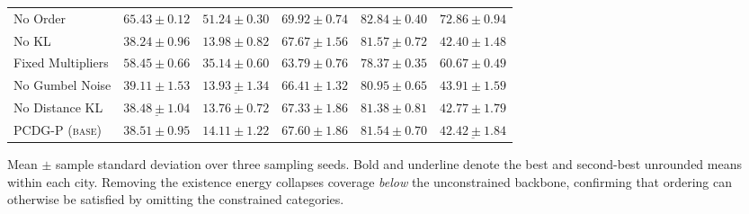 \begin{table}[t]
\begin{tabular}{lrrrrr}
No Order & $65.43\pm 0.12$ & $51.24\pm 0.30$ & $\mathbf{69.92\pm 0.74}$ & $\mathbf{82.84\pm 0.40}$ & $72.86\pm 0.94$ \\
No KL & $\mathbf{38.24\pm 0.96}$ & $13.98\pm 0.82$ & $\underline{67.67\pm 1.56}$ & $\underline{81.57\pm 0.72}$ & $\mathbf{42.40\pm 1.48}$ \\
Fixed Multipliers & $58.45\pm 0.66$ & $35.14\pm 0.60$ & $63.79\pm 0.76$ & $78.37\pm 0.35$ & $60.67\pm 0.49$ \\
No Gumbel Noise & $39.11\pm 1.53$ & $\underline{13.93\pm 1.34}$ & $66.41\pm 1.32$ & $80.95\pm 0.65$ & $43.91\pm 1.59$ \\
No Distance KL & $\underline{38.48\pm 1.04}$ & $\mathbf{13.76\pm 0.72}$ & $67.33\pm 1.86$ & $81.38\pm 0.81$ & $42.77\pm 1.79$ \\
\textsc{PCDG-P (base)} & $38.51\pm 0.95$ & $14.11\pm 1.22$ & $67.60\pm 1.86$ & $81.54\pm 0.70$ & $\underline{42.42\pm 1.84}$ \\
\bottomrule
\end{tabular}
\par\smallskip
\begin{minipage}{\textwidth}\footnotesize
Mean $\pm$ sample standard deviation over three sampling seeds. Bold and underline denote the best and
second-best unrounded means
within each city. Removing the existence energy collapses coverage \emph{below} the unconstrained
backbone, confirming that ordering can otherwise be satisfied by omitting the constrained
categories.
\end{minipage}
\end{table}
